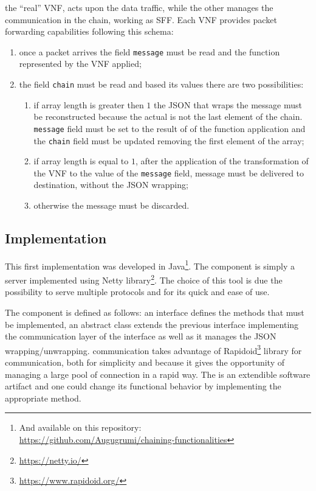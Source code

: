 the ``real'' VNF, acts upon the data traffic, while the other manages
the communication in the chain, working as SFF. Each VNF
provides packet forwarding capabilities following this schema:
\begin{enumerate}
  \item once a packet arrives the field \texttt{message} must be read and the
  function represented by the VNF applied;
  \item the field \texttt{chain} must be read and based its values there are two
  possibilities:
  \begin{enumerate}
    \item if array length is greater then $1$ the JSON that wraps the message
    must be reconstructed because the actual \vnf{} is not the last
    element of the chain. \texttt{message} field must be set to the result of
    of the function application and the \texttt{chain} field must be updated
    removing the first element of the array;
    \item if array length is equal to $1$, after the application of the
    transformation of the VNF to the value of the \texttt{message} field,
    message must be delivered to destination, without the JSON wrapping;
    \item otherwise the message must be discarded.
  \end{enumerate}
\end{enumerate}

\subsection{Implementation}
This first implementation was developed in Java\footnote{And available on
this repository: \\\url{https://github.com/Augugrumi/chaining-functionalities}}.
The \enchainer{} component is simply a server implemented using Netty
library\footnote{\url{https://netty.io/}}. The choice of this tool is due
the possibility to serve multiple protocols and for its quick and ease of use.

The \vnf{} component is defined as follows: an interface defines the methods
that must be implemented, an abstract class extends the previous interface
implementing the communication layer of the interface as well as it manages the
JSON wrapping/unwrapping. \vnf{} communication takes advantage of
Rapidoid\footnote{\url{https://www.rapidoid.org/}} library for communication,
both for simplicity and because it gives the opportunity of
managing a large pool of connection in a rapid way. The \vnf{} is an extendible
software artifact and one could change its functional behavior by implementing
the appropriate method. 

